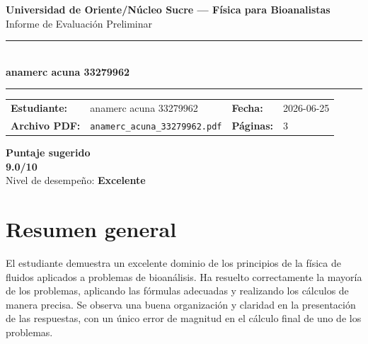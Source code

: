 \documentclass[11pt,a4paper]{article}
\begin{document}
\begin{center}
  {\Large\bfseries\color{azulTitulo} Universidad de Oriente/Núcleo Sucre --- Física para Bioanalistas}\\[4pt]
  {\large Informe de Evaluación Preliminar}\\[12pt]
  \rule{\linewidth}{1.2pt}\\[6pt]
  {\LARGE\bfseries anamerc acuna 33279962}\\[4pt]
  \rule{\linewidth}{0.6pt}
\end{center}

\vspace{4pt}
\begin{tcolorbox}[cajaTitulo, title=Datos del informe]
\begin{tabular}{@{}llll@{}}
  \textbf{Estudiante:}  & anamerc acuna 33279962  &
  \textbf{Fecha:}       & 2026-06-25 \\[4pt]
  \textbf{Archivo PDF:} & \texttt{anamerc\_acuna\_33279962.pdf}  &
  \textbf{Páginas:}     & 3 \\
\end{tabular}
\end{tcolorbox}

\vspace{6pt}
\begin{center}
  \begin{tcolorbox}[
    enhanced,
    colback=white, colframe=desempeno_excelente,
    width=0.62\linewidth,
    boxrule=2pt,
    halign=center, valign=center,
    top=8pt, bottom=8pt,
  ]
    \centering
    {\large\bfseries Puntaje sugerido}\\[6pt]
    {\Huge\bfseries\color{desempeno_excelente} 9.0/10}\\[6pt]
    {\large Nivel de desempeño: \textbf{\color{desempeno_excelente} Excelente}}
  \end{tcolorbox}
\end{center}

\section*{Resumen general}
El estudiante demuestra un excelente dominio de los principios de la física de fluidos aplicados a problemas de bioanálisis. Ha resuelto correctamente la mayoría de los problemas, aplicando las fórmulas adecuadas y realizando los cálculos de manera precisa. Se observa una buena organización y claridad en la presentación de las respuestas, con un único error de magnitud en el cálculo final de uno de los problemas.
\end{document}

